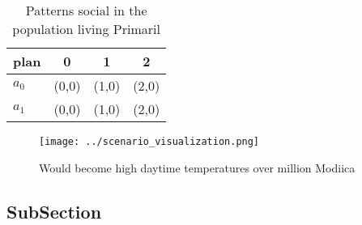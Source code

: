 \documentclass[a4paper]{article}
\begin{document}
\begin{table}
\begin{adjustbox}{width=0.6\columnwidth}
\begin{tabular}{|l|l|l|l|}
\hline
\textbf{plan} & \multicolumn{1}{c|}{\textbf{0}} & \multicolumn{1}{c|}{\textbf{1}} & \multicolumn{1}{c|}{\textbf{2}} \\ \hline
\textbf{$a_0$}  & (0,0) & (1,0) & (2,0) \\ \hline
\textbf{$a_1$}  & (0,0) & (1,0) & (2,0) \\ \hline
\end{tabular}
\end{adjustbox}
\caption{Patterns social in the population living Primaril
}
\end{table}

\begin{figure}
\centering
\texttt{[image: ../scenario\_visualization.png]}
\caption{Would become high daytime temperatures over million Modiica
}
\end{figure}
 
\subsection{SubSection}
\end{document}
